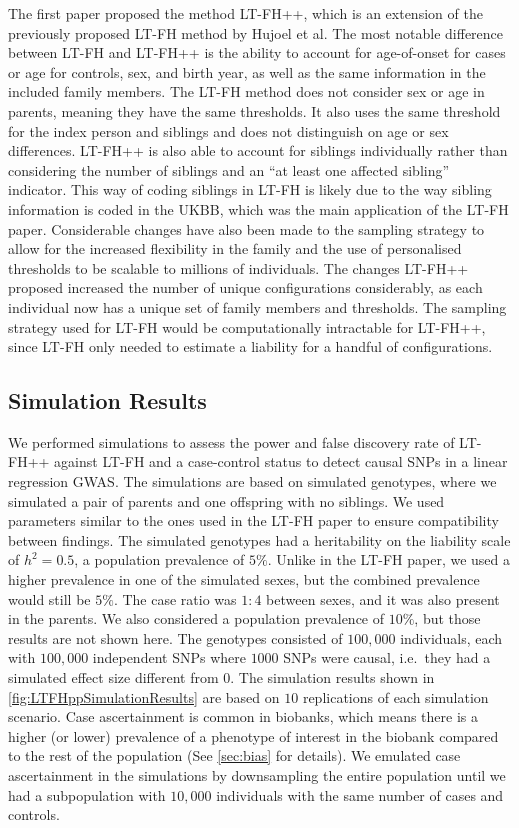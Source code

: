 The first paper proposed the method LT-FH++, which is an extension of the previously proposed LT-FH method by Hujoel et al\cite{hujoel2020liability}. The most notable difference between LT-FH and LT-FH++ is the ability to account for age-of-onset for cases or age for controls, sex, and birth year, as well as the same information in the included family members. The LT-FH method does not consider sex or age in parents, meaning they have the same thresholds. It also uses the same threshold for the index person and siblings and does not distinguish on age or sex differences. LT-FH++ is also able to account for siblings individually rather than considering the number of siblings and an \enquote{at least one affected sibling} indicator. This way of coding siblings in LT-FH is likely due to the way sibling information is coded in the UKBB, which was the main application of the LT-FH paper. Considerable changes have also been made to the sampling strategy to allow for the increased flexibility in the family and the use of personalised thresholds to be scalable to millions of individuals.  The changes LT-FH++ proposed increased the number of unique configurations considerably, as each individual now has a unique set of family members and thresholds. The sampling strategy used for LT-FH would be computationally intractable for LT-FH++, since LT-FH only needed to estimate a liability for a handful of configurations.


\subsection{Simulation Results}
We performed simulations to assess the power and false discovery rate of LT-FH++ against LT-FH and a case-control status to detect causal SNPs in a linear regression GWAS. The simulations are based on simulated genotypes, where we simulated a pair of parents and one offspring with no siblings. We used parameters similar to the ones used in the LT-FH paper to ensure compatibility between findings. The simulated genotypes had a heritability on the liability scale of $ h^2 = 0.5 $, a population prevalence of $ 5\% $. Unlike in the LT-FH paper, we used a higher prevalence in one of the simulated sexes, but the combined prevalence would still be $ 5\% $. The case ratio was $ 1{:}4 $ between sexes, and it was also present in the parents. We also considered a population prevalence of $ 10\% $, but those results are not shown here. The genotypes consisted of $ 100,000 $ individuals, each with $ 100,000 $ independent SNPs where $ 1000 $ SNPs were causal, i.e.\ they had a simulated effect size different from $ 0 $. The simulation results shown in \cref{fig:LTFHppSimulationResults} are based on $ 10 $ replications of each simulation scenario. Case ascertainment is common in biobanks, which means there is a higher (or lower) prevalence of a phenotype of interest in the biobank compared to the rest of the population (See \cref{sec:bias} for details). We emulated case ascertainment in the simulations by downsampling the entire population until we had a subpopulation with $ 10,000 $ individuals with the same number of cases and controls.

